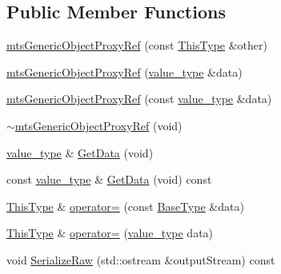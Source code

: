 \subsection*{Public Member Functions}
\begin{DoxyCompactItemize}
\item 
\hyperlink{classmts_generic_object_proxy_ref_a9af6769b331671ed85bd5ca64b020446}{mts\+Generic\+Object\+Proxy\+Ref} (const \hyperlink{classmts_generic_object_proxy_base_adfa837044848485e7241e56816a74083}{This\+Type} \&other)
\item 
\hyperlink{classmts_generic_object_proxy_ref_ac9c91c48ed674fc2c2466ac409ece49e}{mts\+Generic\+Object\+Proxy\+Ref} (\hyperlink{classmts_generic_object_proxy_ref_af50eac4bbf86d9609d7cd77c33d4bf54}{value\+\_\+type} \&data)
\item 
\hyperlink{classmts_generic_object_proxy_ref_add22578ee1c2454fd5635a1c058c1eaf}{mts\+Generic\+Object\+Proxy\+Ref} (const \hyperlink{classmts_generic_object_proxy_ref_af50eac4bbf86d9609d7cd77c33d4bf54}{value\+\_\+type} \&data)
\item 
\hyperlink{classmts_generic_object_proxy_ref_a1ccc0a3d068df80341e85e1c3c399fc3}{$\sim$mts\+Generic\+Object\+Proxy\+Ref} (void)
\item 
\hyperlink{classmts_generic_object_proxy_ref_af50eac4bbf86d9609d7cd77c33d4bf54}{value\+\_\+type} \& \hyperlink{classmts_generic_object_proxy_ref_af067553e3178323f5327ad552698135f}{Get\+Data} (void)
\item 
const \hyperlink{classmts_generic_object_proxy_ref_af50eac4bbf86d9609d7cd77c33d4bf54}{value\+\_\+type} \& \hyperlink{classmts_generic_object_proxy_ref_adb9cebfd67fe512f9622343011cec5f7}{Get\+Data} (void) const 
\item 
\hyperlink{classmts_generic_object_proxy_base_adfa837044848485e7241e56816a74083}{This\+Type} \& \hyperlink{classmts_generic_object_proxy_ref_a737d3e414cdad49d8fc32397644d545a}{operator=} (const \hyperlink{classcmn_generic_object}{Base\+Type} \&data)
\item 
\hyperlink{classmts_generic_object_proxy_base_adfa837044848485e7241e56816a74083}{This\+Type} \& \hyperlink{classmts_generic_object_proxy_ref_aa688ddf932da6573a220ee8147e96f6a}{operator=} (\hyperlink{classmts_generic_object_proxy_ref_af50eac4bbf86d9609d7cd77c33d4bf54}{value\+\_\+type} data)
\item 
void \hyperlink{classmts_generic_object_proxy_ref_a7880193bab0e84ddd37374df19eab5ea}{Serialize\+Raw} (std\+::ostream \&output\+Stream) const 
\item 

\end{DoxyCompactItemize}
